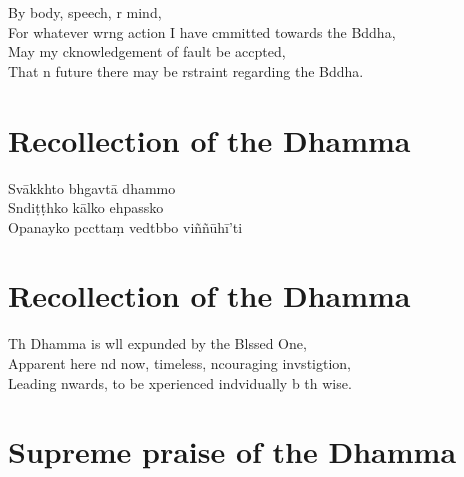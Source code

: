 
By body, speech, r mind,\\
For whatever wrng action I have cmmitted towards the Bddha,\\
May my cknowledgement of fault be accpted,\\
That n future there may be rstraint regarding the Bddha.

\chapter{Recollection of the Dhamma}

\begin{leader}
\end{leader}

Svākkhto bhgavtā dhammo\\
Sndiṭṭhko kālko ehpassko\\
Opanayko pccttaṃ vedtbbo viññūhī'ti

\chapter{Recollection of the Dhamma}

\begin{leader}
\end{leader}

Th Dhamma is wll expunded by the Blssed One,\\
Apparent here nd now, timeless, ncouraging invstigtion,\\
Leading nwards, to be xperienced indvidually b th wise.

\chapter{Supreme praise of the Dhamma}

\begin{leader}
\end{leader}

